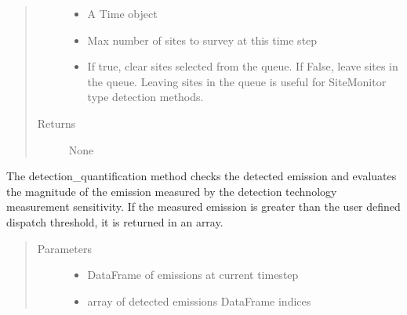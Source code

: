 \documentclass[letterpaper,10pt,english]{sphinxmanual}
\begin{document}
\begin{fulllineitems}
\begin{fulllineitems}
\begin{quote}
\begin{description}
\begin{itemize}
\item {} 
 \textendash{} A Time object

\item {} 
 \textendash{} Max number of sites to survey at this time step

\item {} 
 \textendash{} If true, clear sites selected from the queue. If False, leave sites in the queue.
Leaving sites in the queue is useful for SiteMonitor type detection methods.

\end{itemize}

\item[{Returns}] \leavevmode
None

\end{description}\end{quote}

\end{fulllineitems}


\begin{fulllineitems}
\label{\detokenize{index:feast.DetectionModules.abstract_detection_method.DetectionMethod.detection_quantification}}
The detection\_quantification method checks the detected emission and evaluates the magnitude of the emission
measured by the detection technology measurement sensitivity. If the measured emission is greater than the
user defined dispatch threshold, it is returned in an array.
\begin{quote}\begin{description}
\item[{Parameters}] \leavevmode\begin{itemize}
\item {} 
 \textendash{} DataFrame of emissions at current time\sphinxhyphen{}step

\item {} 
 \textendash{} array of detected emissions DataFrame indices

\end{itemize}


\end{description}
\end{quote}
\end{fulllineitems}
\end{fulllineitems}
\end{document}
